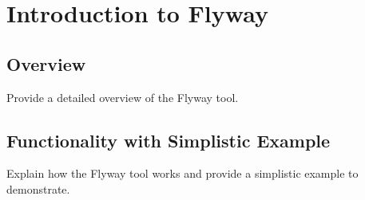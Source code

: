 

\chapter{Introduction to Flyway}

\section{Overview}
%
Provide a detailed overview of the Flyway tool.

\section{Functionality with Simplistic Example}
Explain how the Flyway tool works and provide a simplistic example to demonstrate.
%

%
\newpage